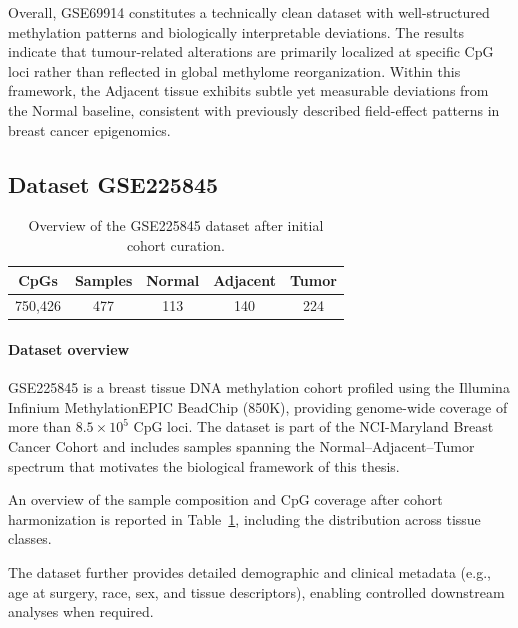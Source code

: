 Overall, GSE69914 constitutes a technically clean dataset with well-structured methylation patterns and biologically interpretable deviations. The results indicate that tumour-related alterations are primarily localized at specific CpG loci rather than reflected in global methylome reorganization. Within this framework, the Adjacent tissue exhibits subtle yet measurable deviations from the Normal baseline, consistent with previously described field-effect patterns in breast cancer epigenomics.

\subsection{Dataset GSE225845}
\label{subsec:gse225845}

\begin{table}[t]
\centering
\caption{Overview of the GSE225845 dataset after initial cohort curation.}
\label{tab:gse225845_overview}
\scriptsize
\begin{tabular}{c c c c c}
\toprule
\textbf{CpGs} &
\textbf{Samples} &
\textbf{Normal} &
\textbf{Adjacent} &
\textbf{Tumor} \\
\midrule
750{,}426 &
477 &
113 &
140 &
224 \\
\bottomrule
\end{tabular}
\end{table}

\paragraph{Dataset overview}
\label{par:gse225845_overview}

GSE225845 is a breast tissue DNA methylation cohort profiled using the Illumina Infinium MethylationEPIC BeadChip (850K), providing genome-wide coverage of more than $8.5\times10^5$ CpG loci. The dataset is part of the NCI-Maryland Breast Cancer Cohort and includes samples spanning the Normal--Adjacent--Tumor spectrum that motivates the biological framework of this thesis.

An overview of the sample composition and CpG coverage after cohort harmonization is reported in Table~\ref{tab:gse225845_overview}, including the distribution across tissue classes.

The dataset further provides detailed demographic and clinical metadata (e.g., age at surgery, race, sex, and tissue descriptors), enabling controlled downstream analyses when required.


